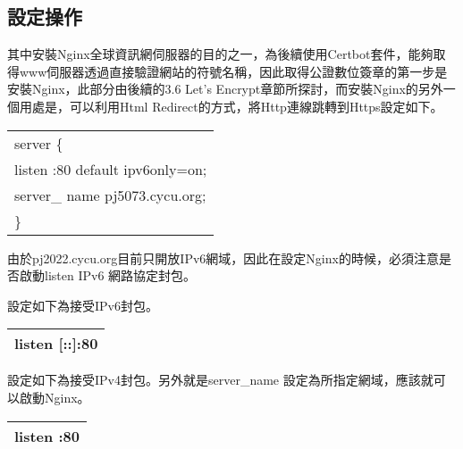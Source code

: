 \renewcommand{\baselinestretch}{20} %
\subsection{設定操作}
\par
\renewcommand{\baselinestretch}{1} %
\twelve \qquad 其中安裝Nginx全球資訊網伺服器的目的之一，為後續使用Certbot套件，能夠取得www伺服器透過直接驗證網站的符號名稱，因此取得公證數位簽章的第一步是安裝Nginx，此部分由後續的3.6 Let's Encrypt章節所探討，而安裝Nginx的另外一個用處是，可以利用Html Redirect的方式，將Http連線跳轉到Https設定如下。
\\
\begin{center}
\begin{tabular}{||p{15cm}|} %
\hline
server \{
\\
\qquad listen \qquad \qquad [::]:80 default ipv6only=on;
\\
\qquad server\_ name \quad pj5073.cycu.org;
\\
\}
\\
\hline
\end{tabular}
\end{center}
\par
\renewcommand{\baselinestretch}{1} %
\twelve \hspace{0.5em} 由於pj2022.cycu.org目前只開放IPv6網域，因此在設定Nginx的時候，必須注意是否啟動listen IPv6 網路協定封包。
\par
\renewcommand{\baselinestretch}{1} %
\twelve \hspace{0.5em} 設定如下為接受IPv6封包。
\par
\begin{center}
\begin{tabular}{||p{15cm}|} %
\hline
listen [::]:80
\\
\hline
\end{tabular}
\end{center}
\par
\renewcommand{\baselinestretch}{1} %
\twelve \hspace{0.5em} 設定如下為接受IPv4封包。另外就是server\_name 設定為所指定網域，應該就可以啟動Nginx。
\par
\begin{center}
\begin{tabular}{||p{15cm}|} %
\hline
listen :80
\\
\hline
\end{tabular}
\end{center}
\par

